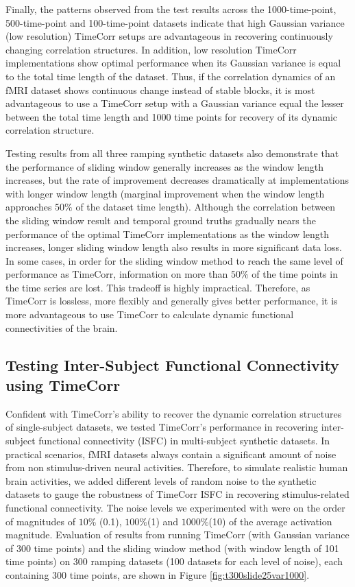\documentclass[11pt]{article}
\begin{document}
Finally, the patterns observed from the test results across the 1000-time-point, 500-time-point and 100-time-point datasets indicate that high Gaussian variance (low resolution) TimeCorr setups are advantageous in recovering continuously changing correlation structures. In addition, low resolution TimeCorr implementations show optimal performance when its Gaussian variance is equal to the total time length of the dataset. Thus, if the correlation dynamics of an fMRI dataset shows continuous change instead of stable blocks, it is most advantageous to use a TimeCorr setup with a Gaussian variance equal the lesser between the total time length and 1000 time points for recovery of its dynamic correlation structure.

Testing results from all three ramping synthetic datasets also demonstrate that the performance of sliding window generally increases as the window length increases, but the rate of improvement decreases dramatically at implementations with longer window length (marginal improvement when the window length approaches $50\%$ of the dataset time length). Although the correlation between the sliding window result and temporal ground truths gradually nears the performance of the optimal TimeCorr implementations as the window length increases, longer sliding window length also results in more significant data loss. In some cases, in order for the sliding window method to reach the same level of performance as TimeCorr, information on more than $50\%$ of the time points in the time series are lost. This tradeoff is highly impractical. Therefore, as TimeCorr is lossless, more flexibly and generally gives better performance, it is more advantageous to use TimeCorr to calculate dynamic functional connectivities of the brain.

\subsection{Testing Inter-Subject Functional Connectivity using TimeCorr}
Confident with TimeCorr's ability to recover the dynamic correlation structures of single-subject datasets, we tested TimeCorr's performance in recovering inter-subject functional connectivity (ISFC) in multi-subject synthetic datasets. In practical scenarios, fMRI datasets always contain a significant amount of noise from non stimulus-driven neural activities. Therefore, to simulate realistic human brain activities, we added different levels of random noise to the synthetic datasets to gauge the robustness of TimeCorr ISFC in recovering stimulus-related functional connectivity. The noise levels we experimented with were on the order of magnitudes of $10\%$ (0.1), $100\%$(1) and $1000\%$(10) of the average activation magnitude. Evaluation of results from running TimeCorr (with Gaussian variance of 300 time points) and the sliding window method (with window length of 101 time points) on 300 ramping datasets (100 datasets for each level of noise), each containing 300 time points, are shown in Figure \ref{fig:t300slide25var1000}.
\end{document}
